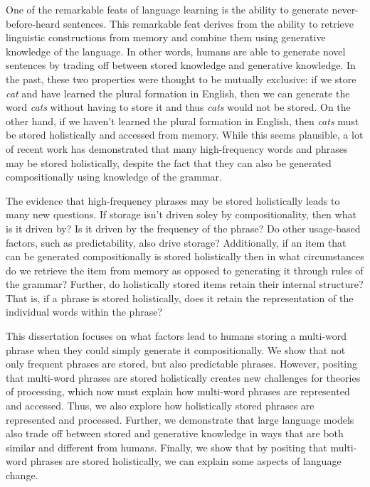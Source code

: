 \documentclass[
  12pt,
  letterpaper,
]{scrreprt}
\begin{document}

One of the remarkable feats of language learning is the ability to
generate never-before-heard sentences. This remarkable feat derives from
the ability to retrieve linguistic constructions from memory and combine
them using generative knowledge of the language. In other words, humans
are able to generate novel sentences by trading off between stored
knowledge and generative knowledge. In the past, these two properties
were thought to be mutually exclusive: if we store \emph{cat} and have
learned the plural formation in English, then we can generate the word
\emph{cats} without having to store it and thus \emph{cats} would not be
stored. On the other hand, if we haven't learned the plural formation in
English, then \emph{cats} must be stored holistically and accessed from
memory. While this seems plausible, a lot of recent work has
demonstrated that many high-frequency words and phrases may be stored
holistically, despite the fact that they can also be generated
compositionally using knowledge of the grammar.

The evidence that high-frequency phrases may be stored holistically
leads to many new questions. If storage isn't driven soley by
compositionality, then what is it driven by? Is it driven by the
frequency of the phrase? Do other usage-based factors, such as
predictability, also drive storage? Additionally, if an item that can be
generated compositionally is stored holistically then in what
circumstances do we retrieve the item from memory as opposed to
generating it through rules of the grammar? Further, do holistically
stored items retain their internal structure? That is, if a phrase is
stored holistically, does it retain the representation of the individual
words within the phrase?

This dissertation focuses on what factors lead to humans storing a
multi-word phrase when they could simply generate it compositionally. We
show that not only frequent phrases are stored, but also predictable
phrases. However, positing that multi-word phrases are stored
holistically creates new challenges for theories of processing, which
now must explain how multi-word phrases are represented and accessed.
Thus, we also explore how holistically stored phrases are represented
and processed. Further, we demonstrate that large language models also
trade off between stored and generative knowledge in ways that are both
similar and different from humans. Finally, we show that by positing
that multi-word phrases are stored holistically, we can explain some
aspects of language change.
\end{document}

